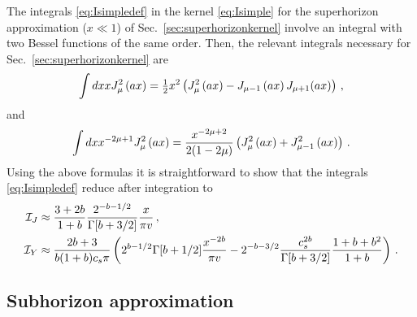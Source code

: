 \documentclass[a4paper,11pt]{article}
\numberwithin{equation}{section}
\begin{document}
The integrals \ref{eq:Isimpledef} in the kernel \ref{eq:Isimple} for the superhorizon approximation ($x\ll1$) of Sec.~\ref{sec:superhorizonkernel} involve an integral with two Bessel functions of the same order. Then, the relevant integrals necessary for Sec.~\ref{sec:superhorizonkernel} are
\begin{align}
\int dx x J^2_{\mu}\left(ax\right)=\tfrac{%
1}{2}x^{2}\left(J^2_{\mu}\left(ax\right)-%
J_{\mu-1}\left(ax\right)J_{\mu+1}(ax)\right)\,,
\end{align}
and
\begin{align}
\int dx x^{-2\mu+1}J^2_{\mu}\left(ax\right)%
=\frac{x^{-2\mu+2}}{2(1-2\mu)}\*\left(J^2_{\mu}\left(%
ax\right)+J^2_{\mu-1}\left(ax\right)\right)\,.
\end{align}
Using the above formulas it is straightforward to show that the integrals \ref{eq:Isimpledef} reduce after integration to
\begin{align}
{\cal I}_J&\approx \frac{3+2b}{1+b}\frac{2^{-b-1/2}}{\Gamma[b+3/2]}\frac{x}{\pi v}\,,\\
{\cal I}_Y&\approx \frac{2b+3}{b(1+b)c_s\pi}\left({2^{b-1/2}\Gamma[b+1/2]}\frac{x^{-2b}}{\pi v}-2^{-b-3/2}\frac{c_s^{2b}}{\Gamma[b+3/2]}\frac{1+b+b^2}{1+b}\right)\,.
\end{align}


\subsection{Subhorizon approximation}
\end{document}
